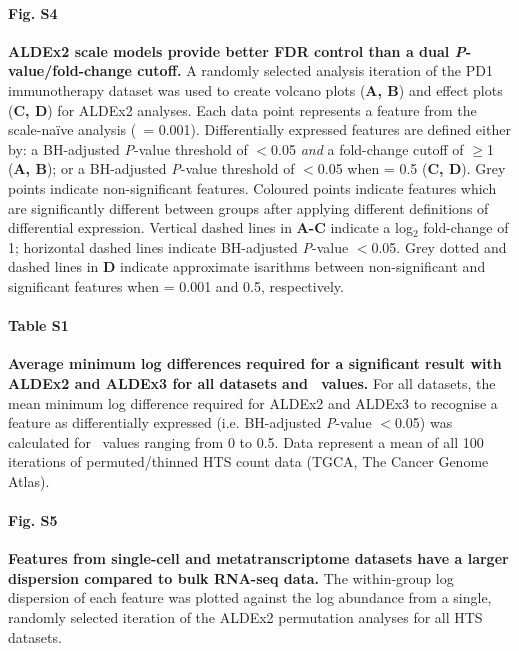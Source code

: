 \documentclass[10pt,letterpaper]{article}
\begin{document}
\paragraph*{Fig. S4}
\label{fig:supFigVolcanoEffectA2}
\textbf{ALDEx2 scale models provide better FDR control than a dual \textit{P}-value/fold-change cutoff.} A randomly selected analysis iteration of the PD1 immunotherapy dataset was used to create volcano plots (\textbf{A, B}) and effect plots (\textbf{C, D}) for ALDEx2 analyses. Each data point represents a feature from the scale-na\"ive analysis (\textgamma~= 0.001). Differentially expressed features are defined either by: a BH-adjusted \textit{P}-value threshold of $<$0.05 \textit{and} a fold-change cutoff of $\geq$1 (\textbf{A, B}); or a BH-adjusted \textit{P}-value threshold of $<$0.05 when \textgamma = 0.5 (\textbf{C, D}). Grey points indicate non-significant features. Coloured points indicate features which are significantly different between groups after applying different definitions of differential expression. Vertical dashed lines in \textbf{A-C} indicate a log$_2$ fold-change of 1; horizontal dashed lines indicate BH-adjusted \textit{P}-value $<$0.05. Grey dotted and dashed lines in \textbf{D} indicate approximate isarithms between non-significant and significant features when \textgamma{} = 0.001 and 0.5, respectively.

\paragraph*{Table S1}
\label{tab:supTabDensity}
\textbf{Average minimum log differences required for a significant result with ALDEx2 and ALDEx3 for all datasets and \textgamma~values.} For all datasets, the mean minimum log difference required for ALDEx2 and ALDEx3 to recognise a feature as differentially expressed (i.e. BH-adjusted \textit{P}-value $<$0.05) was calculated for \textgamma~values ranging from 0 to 0.5. Data represent a mean of all 100 iterations of permuted/thinned HTS count data (TGCA, The Cancer Genome Atlas).

\paragraph*{Fig. S5}
\label{fig:supFigDispAbund}
\textbf{Features from single-cell and metatranscriptome datasets have a larger dispersion compared to bulk RNA-seq data.} The within-group log dispersion of each feature was plotted against the log abundance from a single, randomly selected iteration of the ALDEx2 permutation analyses for all HTS datasets.
\end{document}
